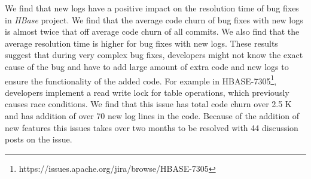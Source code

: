 We find that new logs have a positive impact on the resolution time of bug fixes in \emph{HBase} project. We find that the average code churn of bug fixes with new logs is almost twice that off average code churn of all commits. We also find that the average resolution time is higher for bug fixes with new logs. These results suggest that during very complex bug fixes, developers might not know the exact cause of the bug and have to add large amount of extra code and new logs to ensure the functionality of the added code. For example  in HBASE-7305\footnote{https://issues.apache.org/jira/browse/HBASE-7305}, developers implement a read write lock for table operations, which previously causes race conditions. We find that this issue has total code churn over 2.5 K and has addition of over 70 new log lines in the code. Because of the addition of new features this issues takes over two months to be resolved with 44 discussion posts on the issue. 



